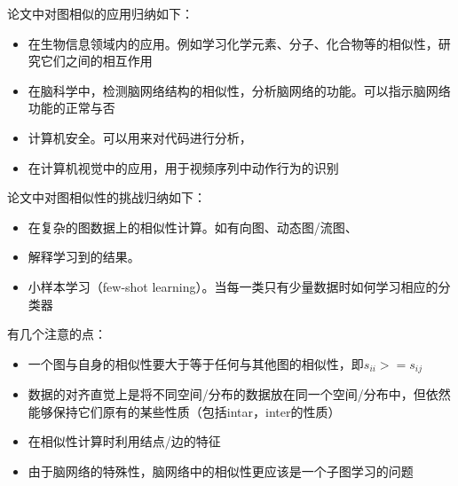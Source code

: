 论文中对图相似的应用归纳如下：
\begin{itemize}
	\item 在生物信息领域内的应用。例如学习化学元素、分子、化合物等的相似性，研究它们之间的相互作用
	\item 在脑科学中，检测脑网络结构的相似性，分析脑网络的功能。可以指示脑网络功能的正常与否
	\item 计算机安全。可以用来对代码进行分析，
	\item 在计算机视觉中的应用，用于视频序列中动作行为的识别
\end{itemize}

论文中对图相似性的挑战归纳如下：
\begin{itemize}
	\item 在复杂的图数据上的相似性计算。如有向图、动态图/流图、
	\item 解释学习到的结果。
	\item 小样本学习（few-shot learning）。当每一类只有少量数据时如何学习相应的分类器
\end{itemize}

有几个注意的点：
\begin{itemize}
	\item 一个图与自身的相似性要大于等于任何与其他图的相似性，即$s_{ii} >= s_{ij}$
	\item 数据的对齐直觉上是将不同空间/分布的数据放在同一个空间/分布中，但依然能够保持它们原有的某些性质（包括intar，inter的性质）
	\item 在相似性计算时利用结点/边的特征
	\item 由于脑网络的特殊性，脑网络中的相似性更应该是一个子图学习的问题
\end{itemize}













